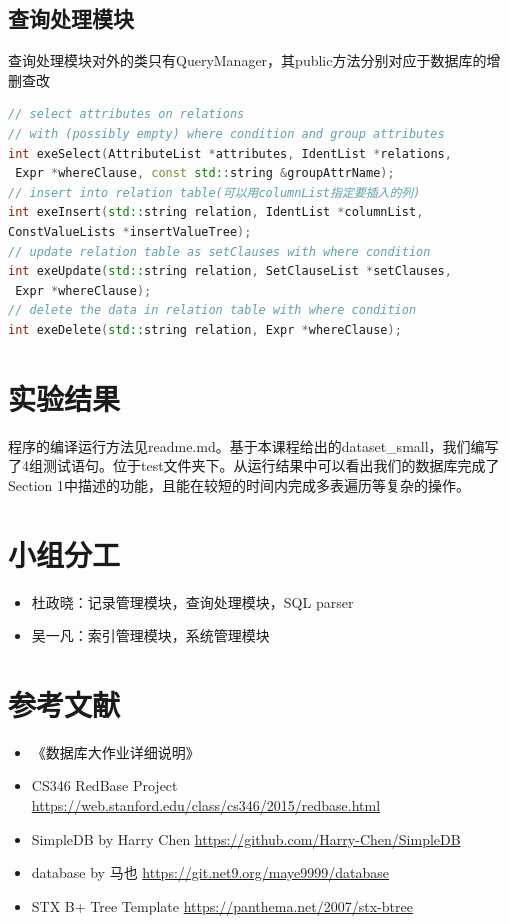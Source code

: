 \documentclass[11pt,UTF8]{report}
\begin{document}
\subsection{查询处理模块}
查询处理模块对外的类只有QueryManager，其public方法分别对应于数据库的增删查改
\begin{lstlisting}[language=C++]
// select attributes on relations 
// with (possibly empty) where condition and group attributes
int exeSelect(AttributeList *attributes, IdentList *relations,
 Expr *whereClause, const std::string &groupAttrName);
// insert into relation table(可以用columnList指定要插入的列)
int exeInsert(std::string relation, IdentList *columnList, 
ConstValueLists *insertValueTree);
// update relation table as setClauses with where condition
int exeUpdate(std::string relation, SetClauseList *setClauses,
 Expr *whereClause);
// delete the data in relation table with where condition
int exeDelete(std::string relation, Expr *whereClause);

\end{lstlisting}


\section{实验结果}
程序的编译运行方法见readme.md。基于本课程给出的dataset\_small，我们编写了4组测试语句。位于test文件夹下。从运行结果中可以看出我们的数据库完成了Section 1中描述的功能，且能在较短的时间内完成多表遍历等复杂的操作。

\section{小组分工}
\begin{itemize}
	\item 杜政晓：记录管理模块，查询处理模块，SQL parser
	\item 吴一凡：索引管理模块，系统管理模块
\end{itemize}

\section{参考文献}
\begin{itemize}
	\item 《数据库大作业详细说明》
	\item CS346 RedBase Project \url{https://web.stanford.edu/class/cs346/2015/redbase.html}
	\item SimpleDB by Harry Chen \url{https://github.com/Harry-Chen/SimpleDB}
	\item database by 马也 \url{https://git.net9.org/maye9999/database}
	\item STX B+ Tree Template \url{https://panthema.net/2007/stx-btree}
\end{itemize}
\end{document}
